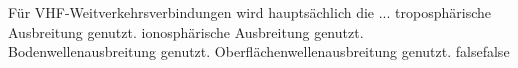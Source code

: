     {Für VHF-Weitverkehrsverbindungen wird hauptsächlich die ...}
    {troposphärische Ausbreitung genutzt.}
    {ionosphärische Ausbreitung genutzt.}
    {Bodenwellenausbreitung genutzt.}
    {Oberflächenwellenausbreitung genutzt.}
    {false}{false}
